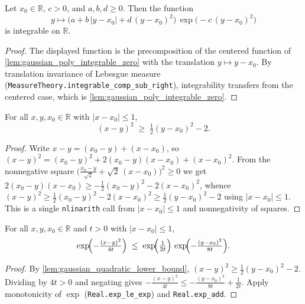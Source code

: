 \begin{lemma}
    \label{lem:shifted_gaussian_integrable}
    \leanok
    Let $x_0 \in \mathbb{R}$, $c > 0$, and $a, b, d \ge 0$. Then the function
    \[ y \mapsto \bigl(a + b\,\lvert y - x_0\rvert + d\,(y-x_0)^2\bigr)\,
        \exp\!\bigl(-c\,(y-x_0)^2\bigr) \]
    is integrable on $\mathbb{R}$.
\end{lemma}
\begin{proof}
    The displayed function is the precomposition of the centered function of
    \cref{lem:gaussian_poly_integrable_zero} with the translation $y \mapsto y - x_0$.
    By translation invariance of Lebesgue measure
    (\texttt{MeasureTheory.integrable\_comp\_sub\_right}), integrability transfers from
    the centered case, which is \cref{lem:gaussian_poly_integrable_zero}.
\end{proof}

\begin{lemma}
    \label{lem:gaussian_quadratic_lower_bound}
    \leanok
    For all $x, y, x_0 \in \mathbb{R}$ with $\lvert x - x_0\rvert \le 1$,
    \[ (x-y)^2 \;\ge\; \tfrac12 (y - x_0)^2 - 2. \]
\end{lemma}
\begin{proof}
    Write $x - y = (x_0 - y) + (x - x_0)$, so
    $(x-y)^2 = (x_0-y)^2 + 2(x_0-y)(x-x_0) + (x-x_0)^2$. From the nonnegative square
    $\bigl(\tfrac{x_0-y}{\sqrt2} + \sqrt2\,(x-x_0)\bigr)^2 \ge 0$ we get
    $2(x_0-y)(x-x_0) \ge -\tfrac12(x_0-y)^2 - 2(x-x_0)^2$, whence
    $(x-y)^2 \ge \tfrac12(x_0-y)^2 - 2(x-x_0)^2 \ge \tfrac12(y-x_0)^2 - 2$ using
    $\lvert x-x_0\rvert \le 1$. This is a single \texttt{nlinarith} call from
    $\lvert x - x_0\rvert \le 1$ and nonnegativity of squares.
\end{proof}

\begin{lemma}
    \label{lem:gaussian_exp_domination}
    \leanok
    For all $x, y, x_0 \in \mathbb{R}$ and $t > 0$ with $\lvert x - x_0\rvert \le 1$,
    \[ \exp\!\Bigl(-\tfrac{(x-y)^2}{4t}\Bigr) \;\le\;
       \exp\!\Bigl(\tfrac{1}{2t}\Bigr)\,\exp\!\Bigl(-\tfrac{(y-x_0)^2}{8t}\Bigr). \]
\end{lemma}
\begin{proof}
    By \cref{lem:gaussian_quadratic_lower_bound}, $(x-y)^2 \ge \tfrac12(y-x_0)^2 - 2$.
    Dividing by $4t > 0$ and negating gives
    $-\tfrac{(x-y)^2}{4t} \le -\tfrac{(y-x_0)^2}{8t} + \tfrac{1}{2t}$. Apply
    monotonicity of $\exp$ (\texttt{Real.exp\_le\_exp}) and \texttt{Real.exp\_add}.
\end{proof}

